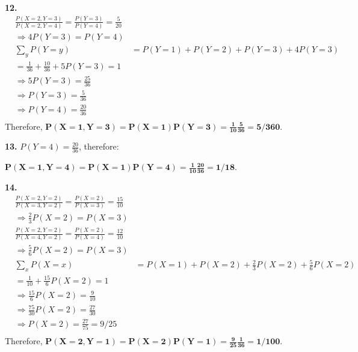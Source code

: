 \documentclass{homework}
\begin{document}
\textbf{\large 12.}
\begin{align*}
    & \frac{P(X=2, Y=3)}{P(X=2, Y=4)} = \frac{P(Y=3)}{P(Y=4)} = \frac{5}{20}\\
    & \Longrightarrow 4 P(Y=3) = P(Y=4)\\
    & \sum\limits_{y}{P(Y=y)} &= P(Y=1) + P(Y=2) + P(Y=3) + 4 P(Y=3) \\
    & = \frac{1}{36} + \frac{10}{36} + 5 P(Y=3) = 1\\
    & \Longrightarrow  5 P(Y=3) = \frac{25}{36}\\
    & \Longrightarrow  P(Y=3) = \frac{5}{36}\\
    & \Longrightarrow  P(Y=4) = \frac{20}{36}\\
\end{align*}
Therefore, $\mathbf{P(X=1, Y=3) = P(X=1) P(Y=3) = \frac{1}{10} \frac{5}{36} = 5/360}$.

\textbf{\large 13.}
$P(Y=4) = \frac{20}{36}$, therefore:

$\mathbf{P(X=1, Y=4) = P(X=1) P(Y=4) = \frac{1}{10} \frac{20}{36} = 1/18}$.

\textbf{\large 14.}
\begin{align*}
    & \frac{P(X=2, Y=2)}{P(X=3, Y=2)} = \frac{P(X=2)}{P(X=3)} = \frac{15}{10}\\
    & \Longrightarrow \frac{2}{3} P(X=2) = P(X=3)\\
    & \frac{P(X=2, Y=2)}{P(X=4, Y=2)} = \frac{P(X=2)}{P(X=4)} = \frac{12}{10}\\
    & \Longrightarrow \frac{5}{6} P(X=2) = P(X=3)\\
    & \sum\limits_{x}{P(X=x)} &= P(X=1) + P(X=2) + \frac{2}{3} P(X=2) + \frac{5}{6} P(X=2) \\
    & = \frac{1}{10} + \frac{15}{6} P(X=2) = 1\\
    & \Longrightarrow  \frac{15}{6} P(X=2) = \frac{9}{10}\\
    & \Longrightarrow  \frac{75}{30} P(X=2) = \frac{27}{30}\\
    & \Longrightarrow  P(X=2) = \frac{27}{75} = 9 / 25\\
\end{align*}
Therefore, $\mathbf{P(X=2, Y=1) = P(X=2) P(Y=1) = \frac{9}{25} \frac{1}{36} = 1/100}$.
\end{document}
